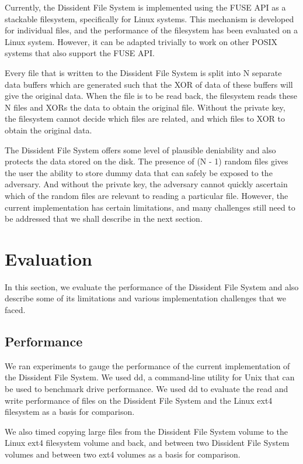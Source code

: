 \documentclass[10pt,twocolumn]{article}
\begin{document}
Currently, the Dissident File System is implemented using the FUSE API as a stackable filesystem, specifically for Linux systems. This mechanism is developed for individual files, and the performance of the filesystem has been evaluated on a Linux system. However, it can be adapted trivially to work on other POSIX systems that also support the FUSE API. 

Every file that is written to the Dissident File System is split into N separate data buffers which are generated such that the XOR of data of these buffers will give the original data. When the file is to be read back, the filesystem reads these N files and XORs the data to obtain the original file. Without the private key, the filesystem cannot decide which files are related, and which files to XOR to obtain the original data. 

The Dissident File System offers some level of plausible deniability and also protects the data stored on the disk. The presence of (N - 1) random files gives the user the ability to store dummy data that can safely be exposed to the adversary. And without the private key, the adversary cannot quickly ascertain which of the random files are relevant to reading a particular file. However, the current implementation has certain limitations, and many challenges still need to be addressed that we shall describe in the next section. 

\section{Evaluation}

In this section, we evaluate the performance of the Dissident File System and also describe some of its limitations and various implementation challenges that we faced. 

\subsection{Performance}
We ran experiments to gauge the performance of the current implementation of the Dissident File System. We used dd, a command-line utility for Unix that can be used to benchmark drive performance. We used dd to evaluate the read and write performance of files on the Dissident File System and the Linux ext4 filesystem as a basis for comparison. 

We also timed copying large files from the Dissident File System volume to the Linux ext4 filesystem volume and back, and between two Dissident File System volumes and between two ext4 volumes as a basis for comparison. 
\end{document}
